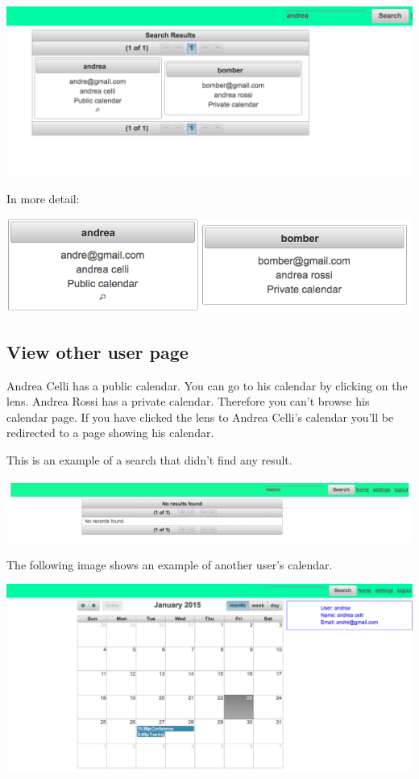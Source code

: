 \documentclass[10pt,a4paper,titlepage]{article}
\begin{document}
\begin{center}
\includegraphics[width=0.7\linewidth]{./images/19_search_results}
\end{center}

In more detail:

\begin{center}
\includegraphics[width=0.7\linewidth]{./images/20_search_results_detail}
\end{center}

\subsection{View other user page}
Andrea Celli has a public calendar. You can go to his calendar by clicking on the lens. Andrea Rossi has a private calendar. Therefore you can’t browse his calendar page. If you have clicked the lens to Andrea Celli’s calendar you’ll be redirected to a page showing his calendar.

This is an example of a search that didn’t find any result.

\begin{center}
\includegraphics[width=\linewidth]{./images/21_search_no_results}
\end{center}

The following image shows an example of another user’s calendar.

\begin{center}
\includegraphics[width=\linewidth]{./images/22_other_user_page}
\end{center}
\end{document}

